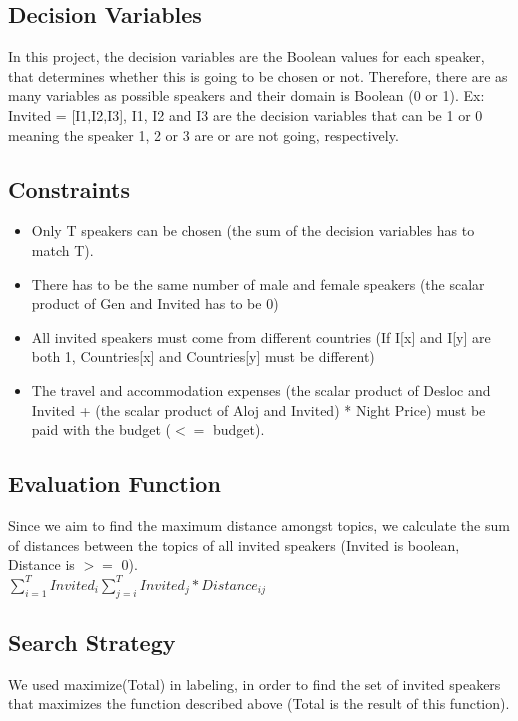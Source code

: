 \documentclass[runningheads,a4paper]{llncs}
\begin{document}
\subsection{Decision Variables}

In this project, the decision variables are the Boolean values for each speaker, that determines whether this is going to be chosen or not. Therefore, there are as many variables as possible speakers and their domain is Boolean (0 or 1). Ex: Invited = [I1,I2,I3], I1, I2 and I3 are the decision variables that can be 1 or 0 meaning the speaker 1, 2 or 3 are or are not going, respectively.

\subsection{Constraints}

\begin{itemize}
\item Only T speakers can be chosen (the sum of the decision variables has to match T).
\item There has to be the same number of male and female speakers (the scalar product of Gen and Invited has to be 0)
\item All invited speakers must come from different countries (If I[x] and I[y] are both 1, Countries[x] and Countries[y] must be different)
\item The travel and accommodation expenses (the scalar product of Desloc and Invited + (the scalar product of Aloj and Invited) * Night Price) must be paid with the budget ($<=$ budget).
\end{itemize}

\subsection{Evaluation Function}

Since we aim to find the maximum distance amongst topics, we calculate the sum of distances between the topics of all invited speakers (Invited is boolean, Distance is $>=$ 0).\\

$\sum_{i=1}^{T} Invited_i{ \sum_{j=i}^{T} Invited_j * Distance_{ij} }$ 

\subsection{Search Strategy}

We used maximize(Total) in labeling, in order to find the set of invited speakers that maximizes the function described above (Total is the result of this function).
\end{document}
